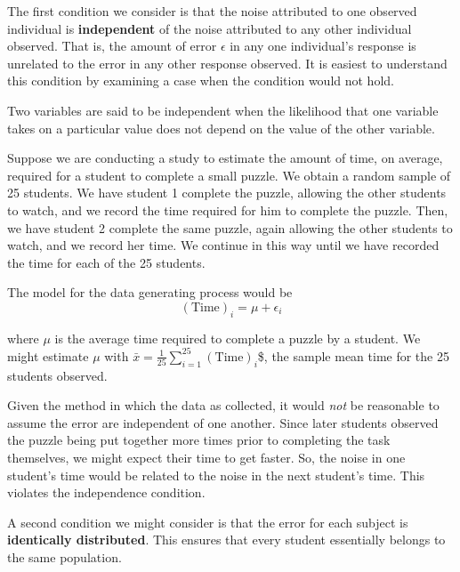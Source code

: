 \documentclass[]{book}
\theoremstyle{plain}
\theoremstyle{mydefn}
\theoremstyle{myexmpl}
\theoremstyle{remark}
\let\BeginKnitrBlock\begin \let\EndKnitrBlock\end
\let\BeginKnitrBlock\begin \let\EndKnitrBlock\end
\begin{document}
The first condition we consider is that the noise attributed to one
observed individual is \textbf{independent} of the noise attributed to
any other individual observed. That is, the amount of error \(\epsilon\)
in any one individual's response is unrelated to the error in any other
response observed. It is easiest to understand this condition by
examining a case when the condition would not hold.

\BeginKnitrBlock{definition}[Independence]
\protect\hypertarget{def:defn-independence}{}{\label{def:defn-independence}
{} }Two variables are said to be independent
when the likelihood that one variable takes on a particular value does
not depend on the value of the other variable.
\EndKnitrBlock{definition}

\BeginKnitrBlock{example}[Puzzle Speed]
\protect\hypertarget{exm:ex-puzzles}{}{\label{exm:ex-puzzles}
{} }Suppose we are conducting a study to
estimate the amount of time, on average, required for a student to
complete a small puzzle. We obtain a random sample of 25 students. We
have student 1 complete the puzzle, allowing the other students to
watch, and we record the time required for him to complete the puzzle.
Then, we have student 2 complete the same puzzle, again allowing the
other students to watch, and we record her time. We continue in this way
until we have recorded the time for each of the 25 students.

The model for the data generating process would be
\[(\text{Time})_i = \mu + \epsilon_i\]

where \(\mu\) is the average time required to complete a puzzle by a
student. We might estimate \(\mu\) with
\(\bar{x} = \frac{1}{25}\sum_{i=1}^{25} (\text{Time})_i\)\$, the sample
mean time for the 25 students observed.

Given the method in which the data as collected, it would \emph{not} be
reasonable to assume the error are independent of one another. Since
later students observed the puzzle being put together more times prior
to completing the task themselves, we might expect their time to get
faster. So, the noise in one student's time would be related to the
noise in the next student's time. This violates the independence
condition.
\EndKnitrBlock{example}

A second condition we might consider is that the error for each subject
is \textbf{identically distributed}. This ensures that every student
essentially belongs to the same population.
\end{document}

